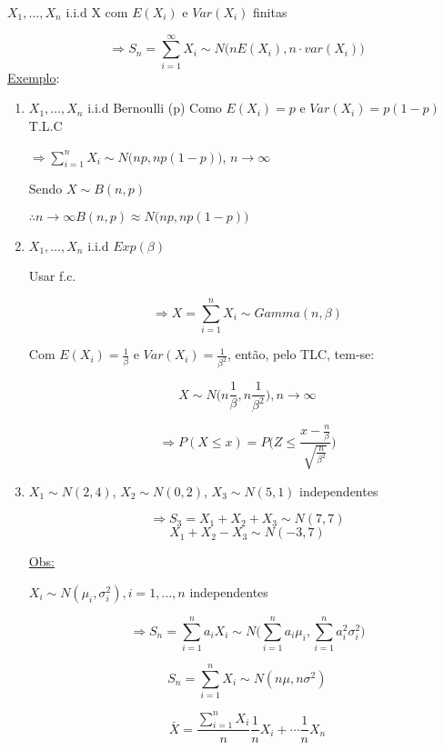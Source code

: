 \documentclass[a4paper,12pt]{article}
\begin{document}
$X_1,\ldots, X_n$ i.i.d X com $E(X_i)$ e $Var(X_i)$ finitas 

$$\Rightarrow S_n  =  \sum\limits_{i=1}^{\infty}X_i \sim N\bigg(nE(X_i), n\cdot var(X_i)\bigg) $$
\underline{Exemplo}:

\begin{enumerate}[label =\arabic*)]
	\item $X_1,\ldots, X_n$ i.i.d Bernoulli (p) Como $E(X_i)=p$ e $Var(X_i)=p(1-p)$
	T.L.C 
	
	$\Rightarrow \sum\limits_{i=1}^{n} X_i \sim N\bigg(np,np(1-p)\bigg)$, $n\rightarrow \infty $ 
	
	Sendo $X\sim B(n,p)$
	
	$\therefore n\rightarrow \infty B(n, p)\approx N\bigg(np,np(1-p)\bigg)$
	
	\item $X_1,\ldots, X_n$ i.i.d $Exp(\beta )$
	
	Usar f.c.
	
	$$\Rightarrow X = \sum\limits_{i=1}^{n} X_i \sim Gamma(n,\beta) $$
	
	Com $E(X_i) = \frac{1}{\beta}$ e $Var(X_i) = \frac{1}{\beta^2}$, então, pelo TLC, tem-se:
	
	$$X\sim N\bigg(  n\frac{1}{\beta},n\frac{1}{\beta^2}\bigg), n\rightarrow \infty $$
	
	$$\Rightarrow P(X\le x) = P\bigg(Z\le \frac{x-\frac{n}{\beta}}{\sqrt{\frac{n}{\beta^2}}}\bigg) $$
	
	\item $X_1 \sim N(2,4)$, $X_2\sim N(0,2)$, $X_3\sim N(5,1)$ independentes
	
	$$\Rightarrow S_3 = X_1 +X_2 + X_3 \sim N(7,7) $$
	$$X_1+X_2-X_3 \sim N(-3,7) $$
	
	\underline{Obs:}
	
	$X_i \sim N(\mu_i,\sigma_i^2), i=1,\ldots,n$ independentes 
	
	$$\Rightarrow S_n = \sum\limits_{i=1}^{n} a_iX_i \sim N\bigg(
	\sum\limits_{i=1}^{n} a_i\mu_i, \sum\limits_{i=1}^{n}a_i^2 \sigma_i^2
	\bigg) $$ 
	
	$$S_n = \sum\limits_{i=1}^{n} X_i \sim N(n\mu, n\sigma^2)  $$
	
	$$\bar X = \frac{\sum\limits_{i=1}^{n} X_i}{n} \frac{1}{n} X_i+\cdots \frac{1}{n}X_n $$
\end{enumerate}
\end{document}
